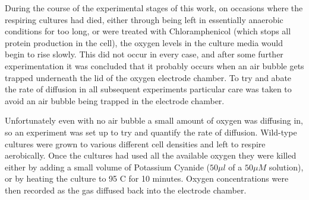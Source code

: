 During the course of the experimental stages of this work, on occasions where the respiring cultures had died, either through being left in essentially anaerobic conditions for too long, or were treated with Chloramphenicol (which stops all protein production in the cell), the oxygen levels in the culture media would begin to rise slowly. This did not occur in every case, and after some further experimentation it was concluded that it probably occurs when an air bubble gets trapped underneath the lid of the oxygen electrode chamber. To try and abate the rate of diffusion in all subsequent experiments particular care was taken to avoid an air bubble being trapped in the electrode chamber.

Unfortunately even with no air bubble a small amount of oxygen was diffusing in, so an experiment was set up to try and quantify the rate of diffusion. Wild-type \Nm{} cultures were grown to various different cell densities and left to respire aerobically. Once the cultures had used all the available oxygen they were killed either by adding a small volume of Potassium Cyanide ($50 \mu l$ of a $50 \mu M$ solution), or by heating the culture to 95 \textdegree{}C for 10 minutes. Oxygen concentrations were then recorded as the gas diffused back into the electrode chamber.%


